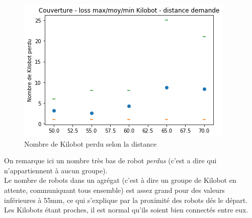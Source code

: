 \documentclass[a4paper]{article}
\begin{document}
\begin{figure}[h!]
	\centering
	\begin{minipage}[c]{.46\linewidth}
		\centering
		\includegraphics[width=1.1\linewidth]{../../script_results/Couverture_loss_kilobot_groupe.png}
		\caption{Nombre de Kilobot perdu selon la distance}
	\end{minipage}
\end{figure}
On remarque ici un nombre très bas de robot \textit{perdus} (c'est a dire qui n'appartiennent à aucun groupe). \\Le nombre de robots dans un agrégat (c'est à dire un groupe de Kilobot en attente, communiquant tous ensemble) est assez grand pour des valeurs inférieures à 55mm, ce qui s'explique par la proximité des robots dés le départ. Les Kilobots étant proches, il est normal qu'ils soient bien connectés entre eux.
\end{document}
